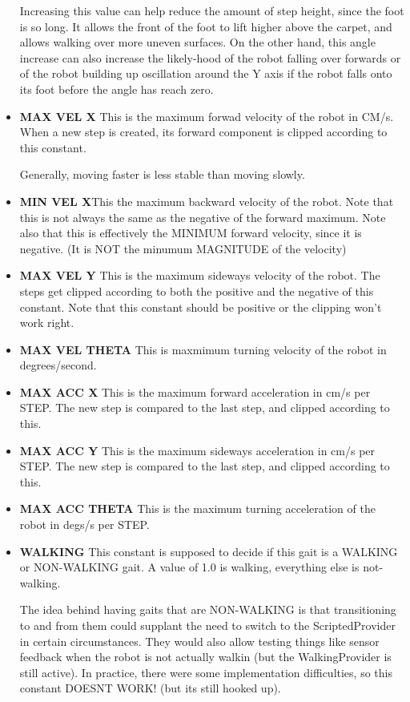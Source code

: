 \documentclass[11pt]{article}
\begin{document}
\begin{itemize}
Increasing this value can help reduce the amount of step height, since
the foot is so long. It allows the front of the foot to lift higher above
the carpet, and allows walking over more uneven surfaces.  On the other hand,
this angle increase can also increase the likely-hood of the robot falling
over forwards or of the robot building up oscillation around the Y axis if
the robot falls onto its foot before the angle has reach zero.


\item {\bf MAX VEL X} This is the maximum forwad velocity of the robot in CM/s.
When a new step is created, its forward component is clipped according to
this constant.

Generally, moving faster is less stable than moving slowly.

\item {\bf MIN VEL X}This the maximum backward velocity of the robot. Note
 that this is not always the same as the negative of the forward maximum.
Note also that this is effectively the MINIMUM forward velocity, since it is
negative. (It is NOT the minumum MAGNITUDE of the velocity)

\item {\bf MAX VEL Y}
This is the maximum sideways velocity of the robot. The steps get clipped
according to both the positive and the negative of this constant. Note
that this constant should be positive or the clipping won't work right.

\item {\bf MAX VEL THETA}
This is maxmimum turning velocity of the robot in degrees/second.

\item {\bf MAX ACC X} This is the maximum forward
acceleration in cm/s per STEP.
The new step is compared to the last step, and clipped according to this.

\item {\bf MAX ACC Y}
This is the maximum sideways
acceleration in cm/s per STEP.
The new step is compared to the last step, and clipped according to this.
\item {\bf MAX ACC THETA}
This is the maximum turning acceleration of the robot in degs/s per STEP.
\item {\bf WALKING} This constant is supposed to decide if this gait is a
WALKING or NON-WALKING gait.  A value of 1.0 is walking, everything else is
not-walking.

The idea behind having gaits that are NON-WALKING is that transitioning to
and from them could supplant the need to switch to the ScriptedProvider in
certain circumstances. They would also allow testing things like sensor
feedback when the robot is not actually walkin (but the WalkingProvider is
still active). In practice, there were some implementation difficulties, so
this constant DOESNT WORK!  (but its still hooked up).


\end{itemize}
\end{document}
